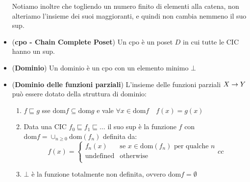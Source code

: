 \documentclass[a4paper,NoNotes,GeneralMath]{stdmdoc}
\newcommand{\sle}{\sqsubseteq}
\newcommand{\dom}{\mbox{dom}}
\newcommand{\leftcurly}[1]{{\left\{{#1}\right.}}
\begin{document}
\begin{itemize}
  Notiamo inoltre che togliendo un numero finito di elementi alla catena, non alteriamo l'insieme dei suoi maggioranti, e quindi non cambia nemmeno il suo sup.
\item ({\bf cpo - Chain Complete Poset}) Un cpo è un poset $D$ in cui tutte le CIC hanno un sup.
\item ({\bf Dominio}) Un dominio è un cpo con un elemento minimo $\bot$
\item ({\bf Dominio delle funzioni parziali}) L'insieme delle funzioni parziali $X \rightarrow Y$ può essere dotato della struttura di dominio:
  \begin{enumerate}
  \item $f \sle g$ sse $\dom f \subseteq \dom g$ e vale $\forall x \in \dom f \quad f(x) = g(x)$
  \item Data una CIC $f_0 \sle f_1 \sle \ldots$ il suo sup è la funzione $f$ con $\dom f = \cup_{n \ge 0} \dom(f_n)$ definita da:
    $$f(x) = \leftcurly{\begin{array}{cc}
                          f_n(x) & \mbox{se } x \in \dom(f_n) \mbox{ per qualche } n \\
                          \mbox{undefined} & \mbox{otherwise} \\
                        \end{array}{cc}}$$
  \item $\bot$ è la funzione totalmente non definita, ovvero $\dom f = \emptyset$
  \end{enumerate}
\end{itemize}
\end{document}
